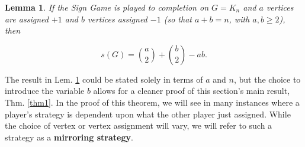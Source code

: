 \documentclass[amsart,11pt]{article}
\theoremstyle{dotless}
\theoremstyle{dotless}
\newtheorem{lem}[thm]{Lemma}
\begin{document}
\begin{lem} \label{lem1}
If the Sign Game is played to completion on $G = K_n$ and $a$ vertices are assigned $+1$ and $b$ vertices assigned $-1$ (so that $a+b = n$, with $a,b \geq 2$), then 

\begin{equation}
         s(G) = \binom{a}{2}+ \binom{b}{2}-ab.
    \end{equation}   
\end{lem}


The result in Lem. \ref{lem1} could be stated solely in terms of $a$ and $n$, but the choice to introduce the variable $b$ allows for a cleaner proof of this section's main result, Thm. \ref{thm1}. In the proof of this theorem, we will see in many instances where a player's strategy is dependent upon what the other player just assigned. While the choice of vertex or vertex assignment will vary, we will refer to such a strategy as a \textbf{mirroring strategy}.
\end{document}
